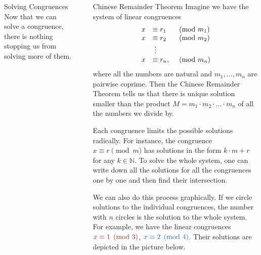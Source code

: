 \documentclass[final]{beamer}
\newlength{\sepwidth}
\newlength{\colwidth}
\newcommand{\separatorcolumn}{\begin{column}{\sepwidth}\end{column}}
\newcommand{\N}{\mathbb{N}}
\newcommand{\clr}{\textcolor{BrickRed}}
\newcommand{\clb}{\textcolor{RoyalBlue}}
\begin{document}
\begin{frame}[t]
\begin{columns}[t]
\begin{column}{\colwidth}
\begin{exampleblock}{Solving Congruences}
Now that we can solve a congruence, there is nothing stopping us from solving
more of them.
\end{exampleblock}
\end{column}
\separatorcolumn
\begin{column}{\colwidth}
\begin{alertblock}{Chinese Remainder Theorem}
 Imagine we have the \alert{system of linear congruences}
 \[
  \begin{array}{r l l}
   x & \equiv r_1  &\pmod{m_1}\\
   x & \equiv r_2  &\pmod{m_2}\\
     & \;\vdots &\\
   x & \equiv r_n, &\pmod{m_n}
  \end{array}
 \]
 where all the numbers are natural and $m_1,\ldots, m_n$ are \alert{pairwise
 coprime}. Then the \alert{Chinese Remainder Theorem} tells us that there is
 unique solution smaller than the product $M = m_1 \cdot m_2 \cdot \ldots \cdot
 m_n$ of all the numbers we divide by.

 \alert{Each congruence limits the possible solutions radically}. For instance,
 the congruence $x \equiv r \pmod{m}$ has solutions in the form $k \cdot m + r$
 for any $k \in \N$. To solve the whole system, one can \alert{write down all
 the solutions for all the congruences one by one and then find their
 intersection}.

We can also do this process graphically. If we circle solutions to the
individual congruences, the number with $n$ circles is the solution to the whole
system. For example, we have the linear congruences $\clr{x \equiv 1 \pmod{3}}$,
$\clb{x \equiv 2 \pmod{4}}$. Their solutions are depicted in the picture below.

\begin{center}
\end{center}
\end{alertblock}
\end{column}
\end{columns}
\end{frame}
\end{document}

